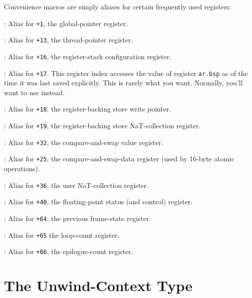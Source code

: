 \documentclass{article}
\begin{document}
Convenience macros are simply aliases for certain frequently used
registers:
\begin{Description}
\item[\Const{UNW\_IA64\_GP}:] Alias for \texttt{+1},
  the global-pointer register.
\item[\Const{UNW\_IA64\_TP}:] Alias for \texttt{+13},
  the thread-pointer register.
\item[\Const{UNW\_IA64\_AR\_RSC}:] Alias for \texttt{+16},
  the register-stack configuration register.
\item[\Const{UNW\_IA64\_AR\_BSP}:] Alias for
  \texttt{+17}.  This register index accesses the
  value of register \texttt{ar.bsp} as of the time it was last saved
  explicitly.  This is rarely what you want.  Normally, you'll want to
  use  instead.
\item[\Const{UNW\_IA64\_AR\_BSPSTORE}:] Alias for \texttt{+18},
  the register-backing store write pointer.
\item[\Const{UNW\_IA64\_AR\_RNAT}:] Alias for \texttt{+19},
  the register-backing store NaT-collection register.
\item[\Const{UNW\_IA64\_AR\_CCV}:] Alias for \texttt{+32},
  the compare-and-swap value register.
\item[\Const{UNW\_IA64\_AR\_CSD}:] Alias for \texttt{+25},
  the compare-and-swap-data register (used by 16-byte atomic operations).
\item[\Const{UNW\_IA64\_AR\_UNAT}:] Alias for \texttt{+36},
  the user NaT-collection register.
\item[\Const{UNW\_IA64\_AR\_FPSR}:] Alias for \texttt{+40},
  the floating-point status (and control) register.
\item[\Const{UNW\_IA64\_AR\_PFS}:] Alias for \texttt{+64},
  the previous frame-state register.
\item[\Const{UNW\_IA64\_AR\_LC}:] Alias for \texttt{+65}
  the loop-count register.
\item[\Const{UNW\_IA64\_AR\_EC}:] Alias for \texttt{+66},
  the epilogue-count register.
\end{Description}


\section{The Unwind-Context Type}
\end{document}
